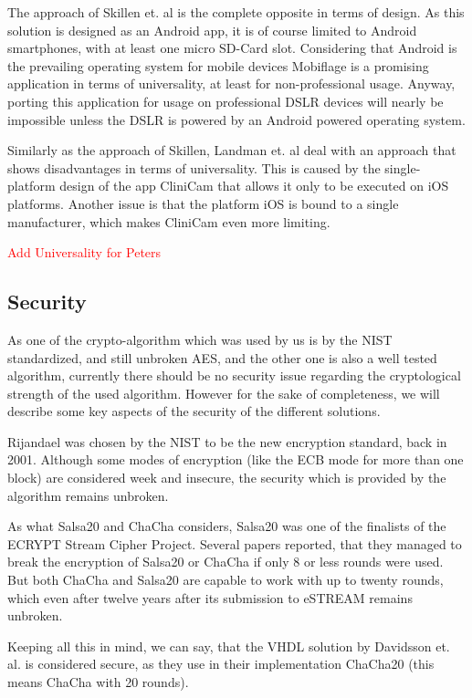 \documentclass[12pt,a4paper,titlepage,oneside]{scrartcl}
\newcommand\todo[1]{\textcolor{red}{#1}}
\begin{document}
The approach of Skillen et. al \cite{skillen2013implementing} is the complete opposite in terms of design.
As this solution is designed as an Android app, it is of course limited to Android smartphones, with at least one micro SD-Card slot.
Considering that Android is the prevailing operating system for mobile devices Mobiflage is a promising application in terms of universality, at least for non-professional usage.
Anyway, porting this application for usage on professional DSLR devices will nearly be impossible unless the DSLR is powered by an Android powered operating system.

Similarly as the approach of Skillen, Landman et. al \cite{pmid25565678} deal with an approach that shows disadvantages in terms of universality.
This is caused by the single-platform design of the app CliniCam that allows it only to be executed on iOS platforms.
Another issue is that the platform iOS is bound to a single manufacturer, which makes CliniCam even more limiting.

\todo{Add Universality for Peters}

\subsection{Security}
As one of the crypto-algorithm which was used by us is by the NIST standardized, and still unbroken AES, and the other one is also a well tested algorithm, currently there should be no security issue regarding the cryptological strength of the used algorithm.
However for the sake of completeness, we will describe some key aspects of the security of the different solutions.

Rijandael was chosen by the NIST to be the new encryption standard, back in 2001.
Although some modes of encryption (like the ECB mode for more than one block) are considered week and insecure, the security which is provided by the algorithm remains unbroken.

As what Salsa20 and ChaCha considers, Salsa20 was one of the finalists of the ECRYPT Stream Cipher Project. \cite{bernstein2008salsa20}
Several papers reported, that they managed to break the encryption of Salsa20 or ChaCha if only 8 or less rounds were used. \cite{aumasson2008new, crowley2006truncated, fischer2006non, tsunoo2007differential}
But both ChaCha and Salsa20 are capable to work with up to twenty rounds, which even after twelve years after its submission to eSTREAM remains unbroken.

Keeping all this in mind, we can say, that the VHDL solution by Davidsson et. al. is considered secure, as they use in their implementation ChaCha20 (this means ChaCha with 20 rounds). \cite{Davidsson2016}
\end{document}

